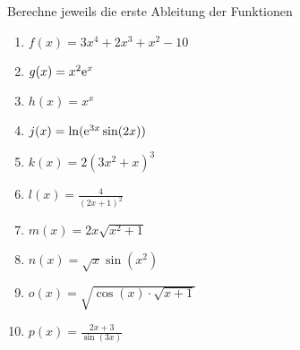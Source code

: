  Berechne jeweils die erste Ableitung der Funktionen
\begin{multicols}{3}
	\begin{enumerate}
		\item $f(x)=3x^4+2x^3+x^2-10$
	  \item $g(x)=x^2\mathrm{e}^x$
		\item $h(x)=x^x$
	  \item $j(x)=\ln(\mathrm{e}^{3x}\sin(2x))$
		\item $k(x) = 2(3x^2+x)^3$
    \item $l(x) = \frac{4}{(2x+1)^2}$
    \item $m(x) = 2x\sqrt{x^2+1}$
    \item $n(x) = \sqrt{x}\sin(x^2)$
    \item $o(x) = \sqrt{\cos(x)\cdot\sqrt{x+1}}$
    \item $p(x) = \frac{2x+3}{\sin(3x)}$
	\end{enumerate}
\end{multicols}

